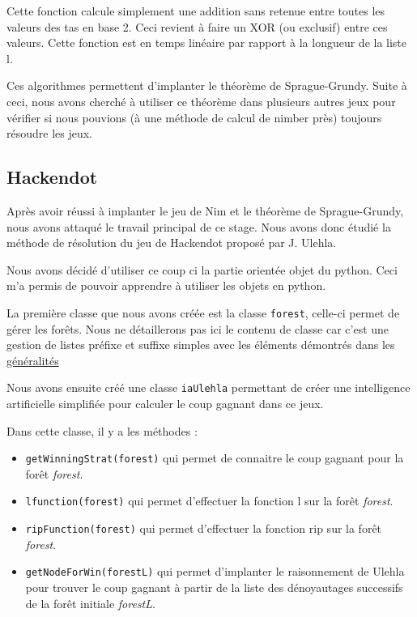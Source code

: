 Cette fonction calcule simplement une addition sans retenue entre toutes les valeurs des tas en base 2. Ceci revient à faire un XOR (ou exclusif) entre ces valeurs. Cette fonction est en temps linéaire par rapport à la longueur de la liste l.

Ces algorithmes permettent d'implanter le théorème de Sprague-Grundy. Suite à ceci, nous avons cherché à utiliser ce théorème dans plusieurs autres jeux pour vérifier si nous pouvions (à une méthode de calcul de nimber près) toujours résoudre les jeux.

\subsection{Hackendot}
\label{sub:Hackendot}

Après avoir réussi à implanter le jeu de Nim et le théorème de Sprague-Grundy, nous avons attaqué le travail principal de ce stage. Nous avons donc étudié la méthode de résolution du jeu de Hackendot proposé par J. Ulehla.

Nous avons décidé d'utiliser ce coup ci la partie orientée objet du python. Ceci m'a permis de pouvoir apprendre à utiliser les objets en python.

La première classe que nous avons créée est la classe \texttt{forest}, celle-ci permet de gérer les forêts. Nous ne détaillerons pas ici le contenu de classe car c'est une gestion de listes préfixe et suffixe simples avec les éléments démontrés dans les \hyperlink{GenArbres}{généralités}

Nous avons ensuite créé une classe \texttt{iaUlehla} permettant de créer une intelligence artificielle simplifiée pour calculer le coup gagnant dans ce jeux.

Dans cette classe, il y a les méthodes :
\begin{itemize}
  \item \texttt{getWinningStrat(forest)} qui permet de connaitre le coup gagnant pour la forêt \textit{forest}.
  \item \texttt{lfunction(forest)} qui permet d'effectuer la fonction l sur la forêt \textit{forest}.
  \item \texttt{ripFunction(forest)} qui permet d'effectuer la fonction rip sur la forêt \textit{forest}.
  \item \texttt{getNodeForWin(forestL)} qui permet d'implanter le raisonnement de Ulehla pour trouver le coup gagnant à partir de la liste des dénoyautages successifs de la forêt initiale \textit{forestL}.
\end{itemize}

